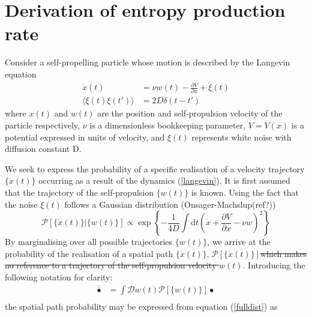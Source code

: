 \documentclass[%
 amsmath,amssymb,
]{revtex4-2}
\newcommand{\Overline}[1]{\overline{\overline{#1}}}
\newcommand{\rmd}[0]{\mathrm{d}}
\begin{document}
\section{Derivation of entropy production rate}\label{methods}

Consider a self-propelling particle whose motion is described by the Langevin equation
\begin{equation}\label{langevin}
\begin{split}
        \dot{x}(t)&= \nu w(t)- \frac{\partial V}{\partial x} +\xi(t)\\
        \langle \xi(t) \xi(t') \rangle &= 2 D \delta(t-t')
\end{split}
\end{equation}
where $x(t)$ and $w(t)$ are the position and self-propulsion velocity of the particle respectively, $\nu$ is a dimensionless bookkeeping parameter, $V = V(x)$ is a potential expressed in units of velocity, and $\xi(t)$ represents white noise with diffusion constant D.

We seek to express the probability of a specific realisation of a velocity trajectory $\{\dot{x}(t)\}$ occurring as a result of the dynamics (\ref{langevin}). It is first assumed that the trajectory of the self-propulsion $\{w(t)\}$ is known. Using the fact that the noise $\xi(t)$ follows a Gaussian distribution (Onsager-Machslup(ref?))
\begin{equation}\label{fulldist}
    \mathcal{P}\left[\{\dot{x}(t)\}|\{w(t)\}\right] \propto \exp \left\{-\frac{1}{4D} \int \rmd t \left(\dot{x} + \frac{\partial V}{\partial x}-\nu w\right)^2
    \right\}
\end{equation}
By marginalising over all possible trajectories $\{w(t)\}$, we arrive at the probability of the realisation of a spatial path $\{\dot{x}(t)\}$, $\mathcal{P}\left[\{\dot{x}(t)\}\right]$\st{which makes no reference to a trajectory of the self-propulsion velocity $w(t)$}. Introducing the following notation for clarity:
\begin{equation}\label{doubleoverline}
\begin{split}
        \Overline{\bullet}&=\int \mathcal{D}{w(t)}\mathcal{P}\left[\{w(t)\}\right]\bullet \\
\end{split}
\end{equation}
the spatial path probability may be expressed from equation (\ref{fulldist}) as
\end{document}
